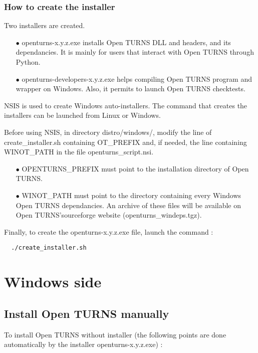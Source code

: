\documentclass[11pt]{article}
\begin{document}
\subsubsection{How to create the installer}

Two installers are created.
\begin{itemize}
\item[$\bullet$]   openturns-x.y.z.exe installs Open TURNS DLL and headers, and its dependancies. It is mainly for users that interact with Open TURNS through Python.
\item[$\bullet$]   openturns-developers-x.y.z.exe helps compiling Open TURNS program and wrapper on Windows. Also, it permits to launch Open TURNS checktests.
\end{itemize}

NSIS is used to create Windows auto-installers. The command that creates the installers can be launched from Linux or Windows.

Before using NSIS, in directory distro/windows/, modify the line of create\_installer.sh containing OT\_PREFIX and, if needed, the line containing WINOT\_PATH in the file openturns\_script.nsi.
\begin{itemize}
\item[$\bullet$]   OPENTURNS\_PREFIX must point to the installation directory of Open TURNS.
\item[$\bullet$]   WINOT\_PATH must point to the directory containing every Windows Open TURNS dependancies. An archive of these files will be available on Open TURNS'sourceforge website (openturns\_windeps.tgz).
\end{itemize}

Finally, to create the openturns-x.y.z.exe file, launch the command :
\begin{verbatim}
  ./create_installer.sh
\end{verbatim}

\section{Windows side}

\subsection{Install Open TURNS manually}

To install Open TURNS without installer (the following points are done automatically by the installer openturns-x.y.z.exe) :
\end{document}

